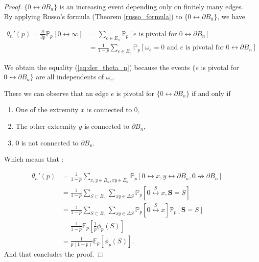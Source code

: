 \documentclass[a4paper,11pt]{article}
\theoremstyle{plain}
\theoremstyle{definition}
\theoremstyle{remark}
\begin{document}
\begin{proof}
$\{0 \longleftrightarrow \partial B_n\}$ is an increasing event depending only on finitely many edges. By applying Russo's formula (Theorem \ref{russo_formula}) to $\{0 \longleftrightarrow \partial B_n\}$, we have

\begin{align} 
\theta_n'(p) = \frac{\partial}{\partial p}{\mathbb{P}_p[0 \longleftrightarrow \infty]} &= \sum_{e \in E_n}\mathbb{P}_p[e \text{ is pivotal for } 0 \longleftrightarrow \partial B_n] \nonumber \\
 &= \frac{1}{1 - p} \sum_{e \in E_n}\mathbb{P}_p[\omega_e = 0 \text{ and } e \text{ is pivotal for } 0 \longleftrightarrow \partial B_n] \label{eq:der_theta_n}
\end{align}

We obtain the equality (\ref{eq:der_theta_n}) because the events $\{e$ is pivotal for $0 \longleftrightarrow \partial B_n\}$ are all independents of $\omega_e$.

There we can observe that an edge $e$ is pivotal for $\{ 0 \longleftrightarrow \partial B_n \}$ if and only if

\begin{enumerate}[(1)]
\item One of the extremity $x$ is connected to $0$,
\item The other extremity $y$ is connected to $\partial B_n$,
\item $0$ is not connected to $\partial B_n$.
\end{enumerate}

Which means that :

\begin{align*}
\theta_n'(p) &= \frac{1}{1 - p}\sum_{x,y \in B_n, xy \in E_n}{\mathbb{P}_p[0 \leftrightarrow x, y \leftrightarrow \partial B_n, 0 \not\leftrightarrow \partial B_n]} \\
&= \frac{1}{1 - p} \sum_{S \subset B_n}{\sum_{xy \in \Delta S}{\mathbb{P}_p[0 \stackrel{S}{\longleftrightarrow} x, \textbf{S} = S]}} \\
&= \frac{1}{1 - p}\sum_{S \subset B_n}{\sum_{xy \in \Delta S}{\mathbb{P}_p[0 \stackrel{S}{\longleftrightarrow} x]}} \mathbb{P}_p[\mathbf{S} = S] \\
&= \frac{1}{1 - p}\mathbb{E}_p\left[\frac{1}{p}\phi_p(S)\right] \\
&= \frac{1}{p(1 - p)}\mathbb{E}_p[\phi_p(S)].
\end{align*}
And that concludes the proof.
\end{proof}
\end{document}
